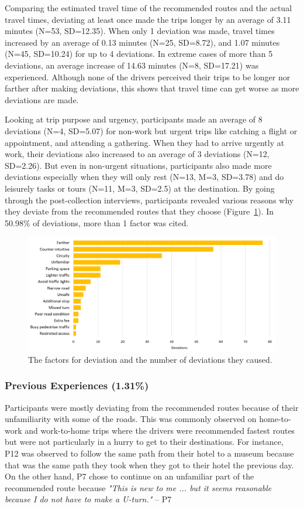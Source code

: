 Comparing the estimated travel time of the recommended routes and the actual travel times, deviating at least once made the trips longer by an average of 3.11 minutes (N=53, SD=12.35). When only 1 deviation was made, travel times increased by an average of 0.13 minutes (N=25, SD=8.72), and 1.07 minutes (N=45, SD=10.24) for up to 4 deviations. In extreme cases of more than 5 deviations, an average increase of 14.63 minutes (N=8, SD=17.21) was experienced. Although none of the drivers perceived their trips to be longer nor farther after making deviations, this shows that travel time can get worse as more deviations are made.

Looking at trip purpose and urgency, participants made an average of 8 deviations (N=4, SD=5.07) for non-work but urgent trips like catching a flight or appointment, and attending a gathering. When they had to arrive urgently at work, their deviations also increased to an average of 3 deviations (N=12, SD=2.26). But even in non-urgent situations, participants also made more deviations especially when they will only rest (N=13, M=3, SD=3.78) and do leisurely tasks or tours (N=11, M=3, SD=2.5) at the destination. By going through the post-collection interviews, participants revealed various reasons why they deviate from the recommended routes that they choose (Figure~\ref{fig:s1-reason_devs}). In 50.98\% of deviations, more than 1 factor was cited.

\begin{figure}[t]
  \centering
  \includegraphics[scale=0.4]{figures/s1-devs-reason.png}
  \caption{The factors for deviation and the number of deviations they caused.}
  \label{fig:s1-reason_devs}
\end{figure}

\subsubsection{Previous Experiences (1.31\%)}
Participants were mostly deviating from the recommended routes because of their unfamiliarity with some of the roads. This was commonly observed on home-to-work and work-to-home trips where the drivers were recommended fastest routes but were not particularly in a hurry to get to their destinations. For instance, P12 was observed to follow the same path from their hotel to a museum because that was the same path they took when they got to their hotel the previous day. On the other hand, P7 chose to continue on an unfamiliar part of the recommended route because \emph{"This is new to me ... but it seems reasonable because I do not have to make a U-turn."} -- P7

